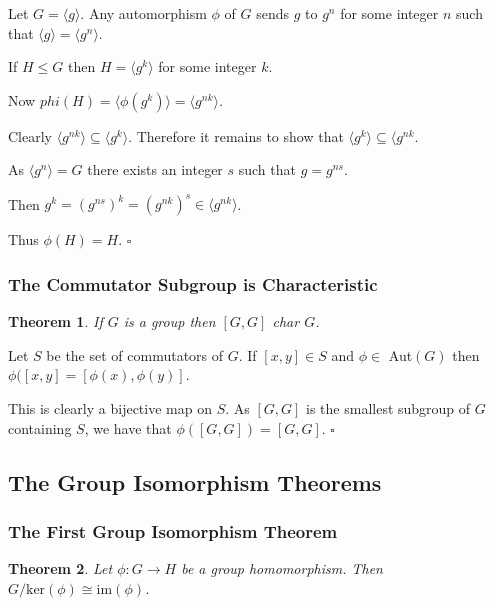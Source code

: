\documentclass[10pt]{article}
\newtheorem{theorem}{Theorem}[section]
\newenvironment{proof}[1][Proof]{\begin{trivlist}
\item[\hskip \labelsep {\itshape #1}]}{\end{trivlist}}
\begin{document}
\begin{proof}
Let $G = \langle g \rangle$. Any automorphism $\phi$ of $G$ sends $g$ to $g^n$ for some integer $n$ such that $\langle g \rangle = \langle g^n \rangle$.

If $H \leq G$ then $H = \langle g^k \rangle$ for some integer $k$.

Now $phi(H) = \langle \phi(g^k) \rangle = \langle g^{nk} \rangle$.

Clearly $\langle g^{nk} \rangle \subseteq \langle g^k \rangle$. Therefore it remains to show that $\langle g^k \rangle \subseteq \langle g^{nk}$.

As $\langle g^n \rangle = G$ there exists an integer $s$ such that $g = g^{ns}$.

Then $g^k = (g^{ns})^k = (g^{nk})^s \in \langle g^{nk} \rangle$.

Thus $\phi(H) = H$. $\square$
\end{proof}

\subsubsection{The Commutator Subgroup is Characteristic}

\begin{theorem}
If $G$ is a group then $[G, G]$ char $G$.
\end{theorem}

\begin{proof}
Let $S$ be the set of commutators of $G$. If $[x, y] \in S$ and $\phi \in$ Aut$(G)$ then $\phi([x, y] = [\phi(x), \phi(y)]$.

This is clearly a bijective map on $S$. As $[G, G]$ is the smallest subgroup of $G$ containing $S$, we have that $\phi([G, G]) = [G, G]$. $\square$
\end{proof}

\subsection{The Group Isomorphism Theorems}

\subsubsection{The First Group Isomorphism Theorem}

\begin{theorem}
Let $\phi : G \to H$ be a group homomorphism. Then $G/\mbox{ker}(\phi) \cong \mbox{im}(\phi)$.
\end{theorem}
\end{document}
